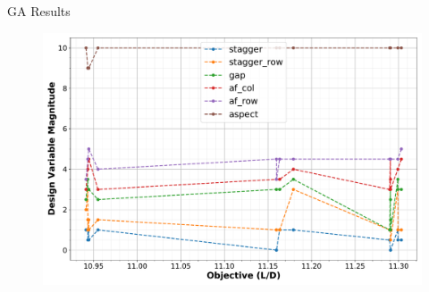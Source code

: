 \begin{frame}{GA Results}

\begin{figure}[h]
  \includegraphics[height=0.8\textheight]{Figures/bestDesigns}
\end{figure}

\end{frame}
